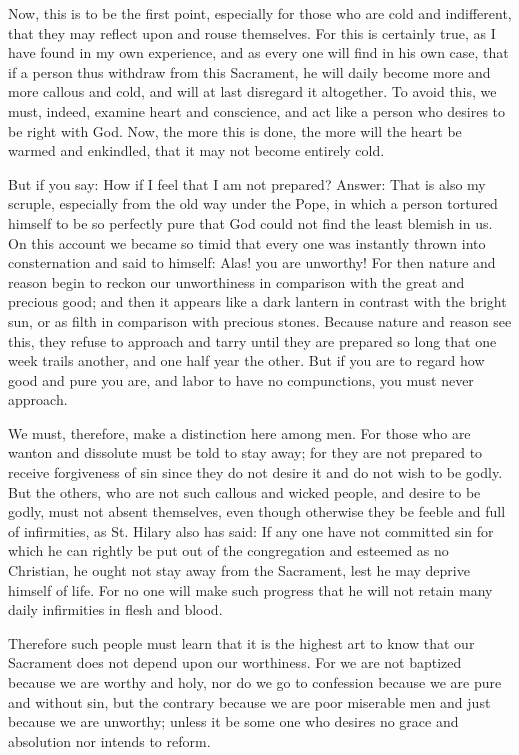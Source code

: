 Now, this is to be the first point, especially for those who are cold
and indifferent, that they may reflect upon and rouse themselves. For
this is certainly true, as I have found in my own experience, and as
every one will find in his own case, that if a person thus withdraw
from this Sacrament, he will daily become more and more callous and
cold, and will at last disregard it altogether. To avoid this, we must,
indeed, examine heart and conscience, and act like a person who desires
to be right with God. Now, the more this is done, the more will the
heart be warmed and enkindled, that it may not become entirely cold.

But if you say: How if I feel that I am not prepared? Answer: That is
also my scruple, especially from the old way under the Pope, in which a
person tortured himself to be so perfectly pure that God could not find
the least blemish in us. On this account we became so timid that every
one was instantly thrown into consternation and said to himself: Alas!
you are unworthy! For then nature and reason begin to reckon our
unworthiness in comparison with the great and precious good; and then
it appears like a dark lantern in contrast with the bright sun, or as
filth in comparison with precious stones. Because nature and reason see
this, they refuse to approach and tarry until they are prepared so long
that one week trails another, and one half year the other. But if you
are to regard how good and pure you are, and labor to have no
compunctions, you must never approach.

We must, therefore, make a distinction here among men. For those who
are wanton and dissolute must be told to stay away; for they are not
prepared to receive forgiveness of sin since they do not desire it and
do not wish to be godly. But the others, who are not such callous and
wicked people, and desire to be godly, must not absent themselves, even
though otherwise they be feeble and full of infirmities, as St. Hilary
also has said: If any one have not committed sin for which he can
rightly be put out of the congregation and esteemed as no Christian, he
ought not stay away from the Sacrament, lest he may deprive himself of
life. For no one will make such progress that he will not retain many
daily infirmities in flesh and blood.

Therefore such people must learn that it is the highest art to know
that our Sacrament does not depend upon our worthiness. For we are not
baptized because we are worthy and holy, nor do we go to confession
because we are pure and without sin, but the contrary because we are
poor miserable men and just because we are unworthy; unless it be some
one who desires no grace and absolution nor intends to reform.

